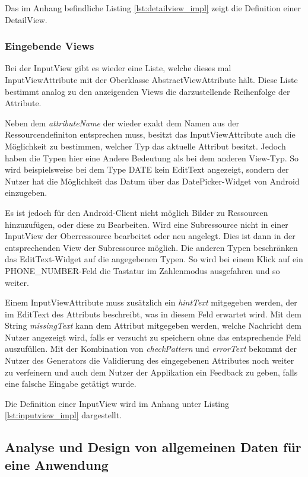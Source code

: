 Das im Anhang befindliche Listing \ref{lst:detailview_impl} zeigt die Definition einer DetailView.

\subsubsection{Eingebende Views}

Bei der InputView gibt es wieder eine Liste, welche dieses mal InputViewAttribute mit der Oberklasse AbstractViewAttribute hält. Diese Liste bestimmt analog zu den anzeigenden Views die darzustellende Reihenfolge der Attribute. 

Neben dem \textit{attributeName} der wieder exakt dem Namen aus der Ressourcendefiniton entsprechen muss, besitzt das InputViewAttribute auch die Möglichkeit zu bestimmen, welcher Typ das aktuelle Attribut besitzt. Jedoch haben die Typen hier eine Andere Bedeutung als bei dem anderen View-Typ. So wird beispielsweise bei dem Type DATE kein EditText angezeigt, sondern der Nutzer hat die Möglichkeit das Datum über das DatePicker-Widget von Android einzugeben. 

Es ist jedoch für den Android-Client nicht möglich Bilder zu Ressourcen hinzuzufügen, oder diese zu Bearbeiten. Wird eine Subressource nicht in einer InputView der Oberressource bearbeitet oder neu angelegt. Dies ist dann in der entsprechenden View der Subressource möglich. Die anderen Typen beschränken das EditText-Widget auf die angegebenen Typen. So wird bei einem Klick auf ein PHONE\_NUMBER-Feld die Tastatur im Zahlenmodus ausgefahren und so weiter.

Einem InputViewAttribute muss zusätzlich ein \textit{hintText} mitgegeben werden, der im EditText des Attributs beschreibt, was in diesem Feld erwartet wird. Mit dem String \textit{missingText} kann dem Attribut mitgegeben werden, welche Nachricht dem Nutzer angezeigt wird, falls er versucht zu speichern ohne das entsprechende Feld auszufüllen. Mit der Kombination von \textit{checkPattern} und \textit{errorText} bekommt der Nutzer des Generators die Validierung des eingegebenen Attributes noch weiter zu verfeinern und auch dem Nutzer der Applikation ein Feedback zu geben, falls eine falsche Eingabe getätigt wurde.

Die Definition einer InputView wird im Anhang unter Listing \ref{lst:inputview_impl} dargestellt.

\subsection{Analyse und Design von allgemeinen Daten für eine Anwendung}


